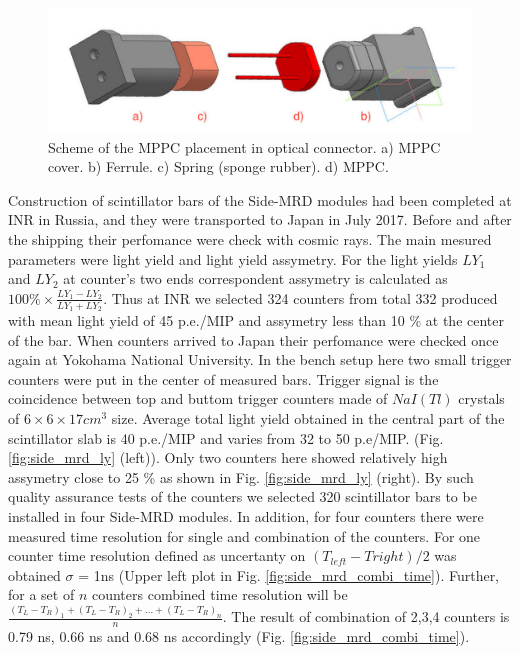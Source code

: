 \begin{figure}[tbh]
\begin{center}
\includegraphics[width=0.8\linewidth]{fig/side_mrd_optical_scheme.pdf}
\end{center}
\caption{
Scheme of the MPPC placement in optical connector.  a) MPPC cover. b) Ferrule. c) Spring (sponge rubber). d) MPPC.
}
\label{fig:side_mrd_optical_scheme}
\end{figure}

Construction of scintillator bars of the Side-MRD modules had been completed at INR in Russia, and they were transported to Japan in July 2017. Before and after the shipping their perfomance were check with cosmic rays. The main mesured parameters were light yield and light yield assymetry. For the light yields $LY_{1}$ and $LY_{2}$ at counter's two ends correspondent assymetry is calculated as $100\% \times \frac{LY_{1}-LY_{2}}{LY_{1}+LY_{2}}$. Thus at INR we selected 324 counters from total 332 produced with mean light yield of 45 p.e./MIP and assymetry less than 10 \% at the center of the bar. When counters arrived to Japan their perfomance were checked once again at Yokohama National University. In the bench setup here two small trigger counters were put in the center of measured bars. Trigger signal is the coincidence between top and buttom trigger counters made of $NaI (Tl)$ crystals of $6 \times 6 \times 17 cm^{3}$ size. Average total light yield obtained in the central part of the scintillator slab is 40 p.e./MIP and varies from 32 to 50 p.e/MIP. (Fig. \ref{fig:side_mrd_ly} (left)). Only two counters here showed relatively high assymetry close to 25 \% as shown in Fig. \ref{fig:side_mrd_ly} (right). By such quality assurance tests of the counters we selected 320 scintillator bars to be installed in four Side-MRD modules. In addition, for four counters there were measured time resolution for single and combination of the counters. For one counter time resolution defined as uncertanty on $(T_{left}-T{right})/2$ was obtained $\sigma$ = 1ns (Upper left plot in Fig. \ref{fig:side_mrd_combi_time}). Further, for a set of $n$ counters combined time resolution will be $\frac{(T_{L}-T_{R})_{1}+(T_{L}-T_{R})_{2}+...+(T_{L}-T_{R})_{n}}{n}$. The result of combination of 2,3,4 counters is 0.79 ns, 0.66 ns and 0.68 ns accordingly (Fig. \ref{fig:side_mrd_combi_time}).  
